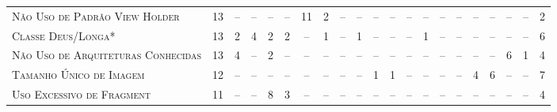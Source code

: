 \begin{table*}
\begin{tabular}{@{}p{4.2cm}p{0.3cm}p{.2cm}p{.2cm}p{.2cm}p{.2cm}p{.2cm}p{.2cm}p{.2cm}p{.2cm}p{.2cm}p{.4cm}p{.4cm}p{.4cm}p{.4cm}p{.4cm}p{.4cm}p{.4cm}p{.4cm}p{.4cm}p{0.2cm}@{}}
\textsc{Não Uso de Padrão View Holder}     	& \multicolumn{1}{c}{13} 	& \multicolumn{1}{c}{--} 	& \multicolumn{1}{c}{--} 	& \multicolumn{1}{c}{--} 	& \multicolumn{1}{c}{--} 	& \multicolumn{1}{c}{11} 	& \multicolumn{1}{c}{2} 	& \multicolumn{1}{c}{--} 	& \multicolumn{1}{c}{--} 	& \multicolumn{1}{c}{--} 	& \multicolumn{1}{c}{--} 	& \multicolumn{1}{c}{--} 	& \multicolumn{1}{c}{--} 	& \multicolumn{1}{c}{--} 	& \multicolumn{1}{c}{--} 	& \multicolumn{1}{c}{--}	& \multicolumn{1}{c}{--} 	& \multicolumn{1}{c}{--} 	& \multicolumn{1}{c}{--} 	& \multicolumn{1}{c}{2} \\
\textsc{Classe Deus/Longa*}                	& \multicolumn{1}{c}{13} 	& \multicolumn{1}{c}{2} 	& \multicolumn{1}{c}{4} 	& \multicolumn{1}{c}{2}	 	& \multicolumn{1}{c}{2} 	& \multicolumn{1}{c}{--} 	& \multicolumn{1}{c}{1} 	& \multicolumn{1}{c}{--} 	& \multicolumn{1}{c}{1} 	& \multicolumn{1}{c}{--} 	& \multicolumn{1}{c}{--} 	& \multicolumn{1}{c}{--} 	& \multicolumn{1}{c}{1} 	& \multicolumn{1}{c}{--} 	& \multicolumn{1}{c}{--} 	& \multicolumn{1}{c}{--}	& \multicolumn{1}{c}{--} 	& \multicolumn{1}{c}{--} 	& \multicolumn{1}{c}{--} 	& \multicolumn{1}{c}{6} \\
\textsc{Não Uso de Arquiteturas Conhecidas}	& \multicolumn{1}{c}{13} 	& \multicolumn{1}{c}{4} 	& \multicolumn{1}{c}{--} 	& \multicolumn{1}{c}{2}	 	& \multicolumn{1}{c}{--} 	& \multicolumn{1}{c}{--} 	& \multicolumn{1}{c}{--} 	& \multicolumn{1}{c}{--} 	& \multicolumn{1}{c}{--} 	& \multicolumn{1}{c}{--} 	& \multicolumn{1}{c}{--} 	& \multicolumn{1}{c}{--} 	& \multicolumn{1}{c}{--} 	& \multicolumn{1}{c}{--} 	& \multicolumn{1}{c}{--} 	& \multicolumn{1}{c}{--}	& \multicolumn{1}{c}{--} 	& \multicolumn{1}{c}{6} 	& \multicolumn{1}{c}{1} 	& \multicolumn{1}{c}{4} \\
\textsc{Tamanho Único de Imagem}           	& \multicolumn{1}{c}{12} 	& \multicolumn{1}{c}{--} 	& \multicolumn{1}{c}{--} 	& \multicolumn{1}{c}{--} 	& \multicolumn{1}{c}{--} 	& \multicolumn{1}{c}{--} 	& \multicolumn{1}{c}{--} 	& \multicolumn{1}{c}{--} 	& \multicolumn{1}{c}{--} 	& \multicolumn{1}{c}{1} 	& \multicolumn{1}{c}{1} 	& \multicolumn{1}{c}{--} 	& \multicolumn{1}{c}{--} 	& \multicolumn{1}{c}{--} 	& \multicolumn{1}{c}{--} 	& \multicolumn{1}{c}{4}		& \multicolumn{1}{c}{6} 	& \multicolumn{1}{c}{--} 	& \multicolumn{1}{c}{--} 	& \multicolumn{1}{c}{7} \\
\textsc{Uso Excessivo de Fragment}         	& \multicolumn{1}{c}{11} 	& \multicolumn{1}{c}{--} 	& \multicolumn{1}{c}{--} 	& \multicolumn{1}{c}{8}	 	& \multicolumn{1}{c}{3} 	& \multicolumn{1}{c}{--} 	& \multicolumn{1}{c}{--} 	& \multicolumn{1}{c}{--} 	& \multicolumn{1}{c}{--} 	& \multicolumn{1}{c}{--} 	& \multicolumn{1}{c}{--} 	& \multicolumn{1}{c}{--} 	& \multicolumn{1}{c}{--} 	& \multicolumn{1}{c}{--} 	& \multicolumn{1}{c}{--} 	& \multicolumn{1}{c}{--}	& \multicolumn{1}{c}{--} 	& \multicolumn{1}{c}{--} 	& \multicolumn{1}{c}{--} 	& \multicolumn{1}{c}{4} \\

\end{tabular}
\end{table*}
